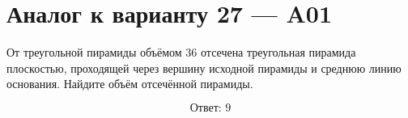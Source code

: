 \documentclass[12pt,a4paper]{article}
\begin{document}
\section*{Аналог к варианту 27 — A01}

От треугольной пирамиды объёмом \(36\) отсечена треугольная пирамида плоскостью, проходящей через вершину исходной пирамиды и среднюю линию основания. Найдите объём отсечённой пирамиды.

\begin{center}
\end{center}

\[
\boxed{\text{Ответ: }9}
\]
\end{document}
